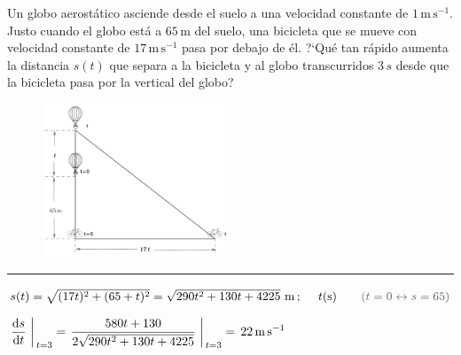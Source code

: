\vspace{1cm}
\begin{miejercicio}

\begin{multicols}{2}
	
Un globo aerostático asciende desde el suelo a una velocidad constante de $1\, \mathrm{m\, s}^{-1}$. Justo cuando el globo está a $65\, \mathrm{m}$ del suelo, una bicicleta que se mueve con velocidad constante de $17\, \mathrm{m\, s}^{-1}$ pasa por debajo de él. ?`Qué tan rápido aumenta la distancia $s(t)$ que separa a la bicicleta y al globo transcurridos $3\, s$ desde que la bicicleta pasa por la vertical del globo?
	\begin{figure}[H]
	\centering
	\includegraphics[width=0.5\textwidth]{imagenes/T02IM12.png}
	\end{figure}		
	\end{multicols}

\vspace{-10mm}
\color{teal!80}
\rule{200pt}{0.2pt}
\color{black}


\vspace{5mm} $ s(t)=\sqrt{(17t)^2+(65+t)^2}=\sqrt{290t^2+130t+4225}\ \mathrm{m} \, ; \quad  \ t(\mathrm{s}) \qquad  \textcolor{gris}{(t=0\leftrightarrow s=65 )}$

\vspace{5mm} $\displaystyle \eval{\dv{s}{t}\ }_{\, t=3}= \eval{\dfrac{580t+130}{2\sqrt{290t^2+130t+4225}}\ }_{\, t=3}=\, 22\, \mathrm{m\, s}^{-1}$

\end{miejercicio}

